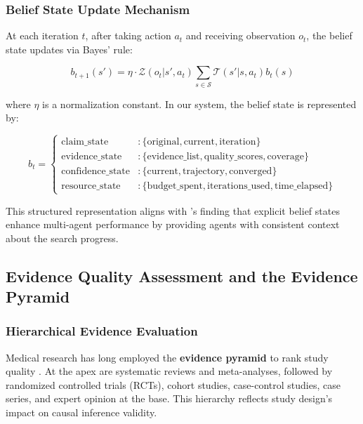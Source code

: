 \subsubsection{Belief State Update Mechanism}

At each iteration $t$, after taking action $a_t$ and receiving observation $o_t$, the belief state updates via Bayes' rule:

\begin{equation}
b_{t+1}(s') = \eta \cdot \mathcal{Z}(o_t | s', a_t) \sum_{s \in \mathcal{S}} \mathcal{T}(s' | s, a_t) b_t(s)
\label{eq:belief_update}
\end{equation}

where $\eta$ is a normalization constant. In our system, the belief state is represented by:

\begin{equation}
b_t = \begin{cases}
    \text{claim\_state} & : \{\text{original}, \text{current}, \text{iteration}\} \\
    \text{evidence\_state} & : \{\text{evidence\_list}, \text{quality\_scores}, \text{coverage}\} \\
    \text{confidence\_state} & : \{\text{current}, \text{trajectory}, \text{converged}\} \\
    \text{resource\_state} & : \{\text{budget\_spent}, \text{iterations\_used}, \text{time\_elapsed}\}
\end{cases}
\label{eq:belief_representation}
\end{equation}

This structured representation aligns with \citet{li2023theory}'s finding that explicit belief states enhance multi-agent performance by providing agents with consistent context about the search progress.

\subsection{Evidence Quality Assessment and the Evidence Pyramid}

\subsubsection{Hierarchical Evidence Evaluation}

Medical research has long employed the \textbf{evidence pyramid} to rank study quality \citep{evidence_pyramid_pmc, evidence_hierarchy_levels}. At the apex are systematic reviews and meta-analyses, followed by randomized controlled trials (RCTs), cohort studies, case-control studies, case series, and expert opinion at the base. This hierarchy reflects study design's impact on causal inference validity.

